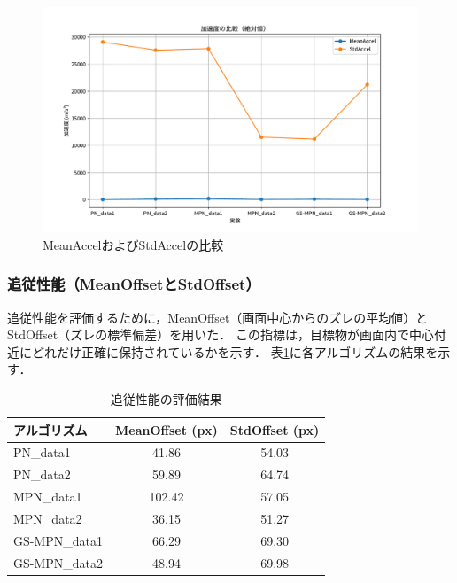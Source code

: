 \begin{figure}[H]
    \centering
    \includegraphics[width=1\textwidth]{figure/Accel.pdf}
    \caption{MeanAccelおよびStdAccelの比較}
    \label{fig:accel_results}
\end{figure}

\subsubsection{追従性能（MeanOffsetとStdOffset）}
追従性能を評価するために，MeanOffset（画面中心からのズレの平均値）とStdOffset（ズレの標準偏差）を用いた．
この指標は，目標物が画面内で中心付近にどれだけ正確に保持されているかを示す．
表\ref{tab:offset_results}に各アルゴリズムの結果を示す．

\begin{table}[H]
    \centering
    \caption{追従性能の評価結果}
    \label{tab:offset_results}
    \begin{tabular}{|l|c|c|}
        \hline
        \textbf{アルゴリズム} & \textbf{MeanOffset (px)} & \textbf{StdOffset (px)} \\ \hline
        PN\_data1             & 41.86                    & 54.03                   \\ \hline
        PN\_data2             & 59.89                    & 64.74                   \\ \hline
        MPN\_data1            & 102.42                   & 57.05                   \\ \hline
        MPN\_data2            & 36.15                    & 51.27                   \\ \hline
        GS-MPN\_data1         & 66.29                    & 69.30                   \\ \hline
        GS-MPN\_data2         & 48.94                    & 69.98                   \\ \hline
    \end{tabular}
\end{table}

